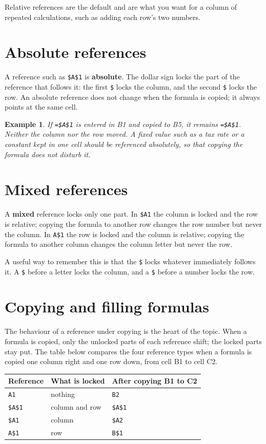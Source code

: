 \documentclass[11pt]{article}
\newtheorem{example}{Example}[section]
\begin{document}
Relative references are the default and are what you want for a column of
repeated calculations, such as adding each row's two numbers.

\section{Absolute references}
A reference such as \texttt{\$A\$1} is \textbf{absolute}. The dollar sign
locks the part of the reference that follows it: the first \texttt{\$} locks
the column, and the second \texttt{\$} locks the row. An absolute reference
does not change when the formula is copied; it always points at the same cell.

\begin{example}
If \texttt{=\$A\$1} is entered in B1 and copied to B5, it remains
\texttt{=\$A\$1}. Neither the column nor the row moved. A fixed value such as
a tax rate or a constant kept in one cell should be referenced absolutely, so
that copying the formula does not disturb it.
\end{example}

\section{Mixed references}
A \textbf{mixed} reference locks only one part. In \texttt{\$A1} the column is
locked and the row is relative; copying the formula to another row changes the
row number but never the column. In \texttt{A\$1} the row is locked and the
column is relative; copying the formula to another column changes the column
letter but never the row.

A useful way to remember this is that the \texttt{\$} locks whatever
immediately follows it. A \texttt{\$} before a letter locks the column, and a
\texttt{\$} before a number locks the row.

\section{Copying and filling formulas}
The behaviour of a reference under copying is the heart of the topic. When a
formula is copied, only the unlocked parts of each reference shift; the locked
parts stay put. The table below compares the four reference types when a
formula is copied one column right and one row down, from cell B1 to cell C2.

\begin{center}
\begin{tabular}{p{}p{}p{}}
\toprule
\textbf{Reference} & \textbf{What is locked} & \textbf{After copying B1 to C2} \\
\midrule
\texttt{A1} & nothing & \texttt{B2} \\
\texttt{\$A\$1} & column and row & \texttt{\$A\$1} \\
\texttt{\$A1} & column & \texttt{\$A2} \\
\texttt{A\$1} & row & \texttt{B\$1} \\
\bottomrule
\end{tabular}
\end{center}
\end{document}

